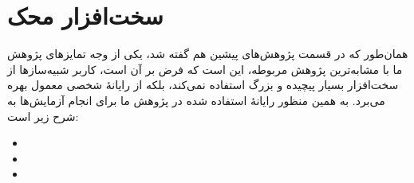 \section{سخت‌افزار محک}
همان‌طور که در قسمت پژوهش‌های پیشین هم گفته شد، یکی از وجه تمایزهای  پژوهش ما با مشابه‌ترین پژوهش مربوطه، این است که فرض بر آن است، کاربر شبیه‌سازها از سخت‌افزار بسیار پیچیده و بزرگ استفاده نمی‌کند، بلکه از رایانهٔ شخصی معمول بهره می‌برد. به همین منظور رایانهٔ استفاده شده در  پژوهش ما برای انجام آزمایش‌ها به شرح زیر است:
\begin{LTR}
	\begin{itemize}
		\item {}
		\item {}
		\item {}
	\end{itemize}
\end{LTR}
